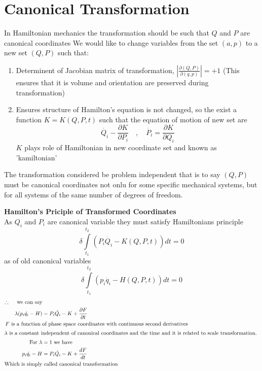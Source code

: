 \section{Canonical Transformation}
	 In Hamiltonian mechanics the transformation should be such that $Q$ and $P$ are canonical coordinates
	We would like to change variables from the set $(a,p)$ to a new set $(Q,P )$ such that:
	\begin{enumerate}
		\item  Determinent of Jacobian matrix of transformation, $\left| \frac{\partial(Q,P)}{\partial(q,p)}\right|=+1 $
		(This ensures that it is volume and orientation are preserved during transformation)
		\item  Ensures structure of Hamilton's equation is not changed, so the exist a function $K=K(Q,P,t)$ 
		such that the equation of motion of new set are	
		$$\dot{Q_i}-\frac{\partial K}{\partial P_i}\quad,\quad\dot{P_i}=\frac{\partial K}{\partial Q_i}$$
		$K$ plays role of Hamiltonian in new coordinate set and known as 'kamiltonian'	
	\end{enumerate}
\begin{note}
	The transformation considered be problem independent that is to say $(Q,P)$ must be canonical coordinates not onlu for some specific mechanical systems, but for all systems of the same number of degrees of freedom.	
\end{note}
\textbf{Hamilton's Priciple of Transformed Coordinates}\vspace{0.1cm}\\
 As $Q_i$ and $P_i$ are canonical variable they must satisfy Hamiltonians principle
\begin{equation}
\delta\int\limits_{t_1}^{t_2}(P_i\dot{Q_i}-K(Q,P,t))dt=0
\end{equation}
as of old canonical variables
\begin{equation}
\delta\int\limits_{t_1}^{t_2}(p_i\dot{q_i}-H(Q,P,t))dt=0
\end{equation}
\begin{align*}
\therefore\quad \text{ we can say}\\
\lambda (p_i\dot{q_i}-H)&=P_i\dot{Q_i}-K+\frac{\partial F}{\partial t}\\
\text{$F$ is a function }&\text{of phase space coordinates with continuous second derivatives}\\
\intertext{$\lambda$ is a constant independent of canonical coordinates and the time and it is related to scale transformation. }
\text{For }\lambda&=1\text{ we have}\\
p_i\dot{q_i}-H&=P_i\dot{Q_i}-K+\frac{dF}{dt}\\
\text{Which is simply}&\text{ called canonical transformation }
\end{align*}





